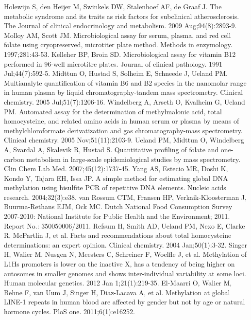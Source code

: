 \begin{thebibliography}{12}
		Holewijn S, den Heijer M, Swinkels DW, Stalenhoef AF, de Graaf J. The metabolic syndrome and its traits as risk factors for subclinical atherosclerosis. The Journal of clinical endocrinology and metabolism. 2009 Aug;94(8):2893-9. 
		Molloy AM, Scott JM. Microbiological assay for serum, plasma, and red cell folate using cryopreserved, microtiter plate method. Methods in enzymology. 1997;281:43-53. 
		Kelleher BP, Broin SD. Microbiological assay for vitamin B12 performed in 96-well microtitre plates. Journal of clinical pathology. 1991 Jul;44(7):592-5. 
		Midttun O, Hustad S, Solheim E, Schneede J, Ueland PM. Multianalyte quantification of vitamin B6 and B2 species in the nanomolar range in human plasma by liquid chromatography-tandem mass spectrometry. Clinical chemistry. 2005 Jul;51(7):1206-16. 
		Windelberg A, Arseth O, Kvalheim G, Ueland PM. Automated assay for the determination of methylmalonic acid, total homocysteine, and related amino acids in human serum or plasma by means of methylchloroformate derivatization and gas chromatography-mass spectrometry. Clinical chemistry. 2005 Nov;51(11):2103-9. 
		Ueland PM, Midttun O, Windelberg A, Svardal A, Skalevik R, Hustad S. Quantitative profiling of folate and one-carbon metabolism in large-scale epidemiological studies by mass spectrometry. Clin Chem Lab Med. 2007;45(12):1737-45. 
		Yang AS, Estecio MR, Doshi K, Kondo Y, Tajara EH, Issa JP. A simple method for estimating global DNA methylation using bisulfite PCR of repetitive DNA elements. Nucleic acids research. 2004;32(3):e38. 
		van Rossum CTM, Fransen HP, Verkaik-Kloosterman J, Buurma-Rethans EJM, Ock MC. Dutch National Food Consumption Survey 2007-2010: National Institute for Public Health and the Environment; 2011. Report No.: 350050006/2011. 
		Refsum H, Smith AD, Ueland PM, Nexo E, Clarke R, McPartlin J, et al. Facts and recommendations about total homocysteine determinations: an expert opinion. Clinical chemistry. 2004 Jan;50(1):3-32. 
		Singer H, Walier M, Nusgen N, Meesters C, Schreiner F, Woelfle J, et al. Methylation of L1Hs promoters is lower on the inactive X, has a tendency of being higher on autosomes in smaller genomes and shows inter-individual variability at some loci. Human molecular genetics. 2012 Jan 1;21(1):219-35. 
		El-Maarri O, Walier M, Behne F, van Uum J, Singer H, Diaz-Lacava A, et al. Methylation at global LINE-1 repeats in human blood are affected by gender but not by age or natural hormone cycles. PloS one. 2011;6(1):e16252. 

\end{thebibliography}
